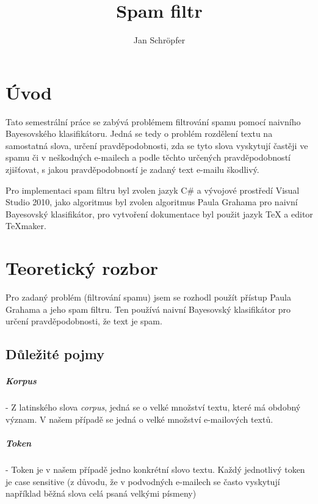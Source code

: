\documentclass{semestralka}
\author{Jan Schröpfer}
\title{Spam filtr}
\begin{document}
\pagestyle{fancy}
\renewcommand{\chaptermark}[1]{\markboth{\textit{#1}}{}}
\renewcommand{\sectionmark}[1]{\markright{\textit{#1}}{}}
\cfoot{\thepage}
\lhead{\leftmark}
\rhead{\rightmark}
\maketitle
\chapter{Úvod}

Tato semestrální práce se zabývá problémem filtrování spamu pomocí naivního Bayesovského klasifikátoru. Jedná se tedy o problém rozdělení textu na samostatná slova, určení pravděpodobnosti, zda se tyto slova vyskytují častěji ve spamu či v neškodných e-mailech a podle těchto určených pravděpodobností zjišťovat, s jakou pravděpodobností je zadaný text e-mailu škodlivý.

Pro implementaci spam filtru byl zvolen jazyk C\# a vývojové prostředí Visual Studio 2010, jako algoritmus byl zvolen algoritmus Paula Grahama pro naivní Bayesovský klasifikátor, pro vytvoření dokumentace byl použit jazyk TeX a editor TeXmaker.

\chapter{Teoretický rozbor}
Pro zadaný problém (filtrování spamu) jsem se rozhodl použít přístup Paula Grahama a jeho spam filtru. Ten používá naivní Bayesovský klasifikátor pro určení pravděpodobnosti, že text je spam.

\section{Důležité pojmy}
\paragraph{Korpus}
- Z latinského slova \textit{corpus}, jedná se o velké množství textu, které má obdobný význam. V našem případě se jedná o velké množství e-mailových textů.

\paragraph{Token}
- Token je v našem případě jedno konkrétní slovo textu. Každý jednotlivý token je case sensitive (z důvodu, že v podvodných e-mailech se často vyskytují například běžná slova celá psaná velkými písmeny)
\end{document}
